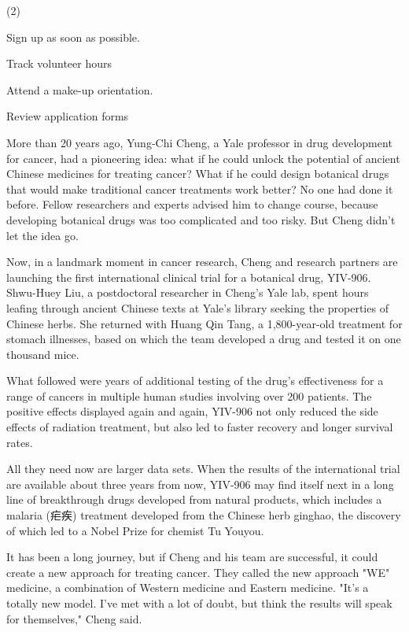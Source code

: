 \documentclass{英语试卷}
\begin{document}
\begin{choices}(2)
  \item Sign up as soon as possible.
  \item Track volunteer hours
  \item Attend a make-up orientation.
  \item Review application forms
\end{choices}
\par More than 20 years ago, Yung-Chi Cheng, a Yale professor in drug development for cancer, had a pioneering idea: what if he could unlock the potential of ancient Chinese medicines for treating cancer? What if he could design botanical drugs that would make traditional cancer treatments work better? No one had done it before. Fellow researchers and experts advised him to change course, because developing botanical drugs was too complicated and too risky. But Cheng didn't let the idea go.\par
\par Now, in a landmark moment in cancer research, Cheng and research partners are launching the first international clinical trial for a botanical drug, YIV-906. Shwu-Huey Liu, a postdoctoral researcher in Cheng's Yale lab, spent hours leafing through ancient Chinese texts at Yale's library seeking the properties of Chinese herbs. She returned with Huang Qin Tang, a 1,800-year-old treatment for stomach illnesses, based on which the team developed a drug and tested it on one thousand mice.\par
\par What followed were years of additional testing of the drug's effectiveness for a range of cancers in multiple human studies involving over 200 patients. The positive effects displayed again and again, YIV-906 not only reduced the side effects of radiation treatment, but also led to faster recovery and longer survival rates.\par
\par All they need now are larger data sets. When the results of the international trial are available about three years from now, YIV-906 may find itself next in a long line of breakthrough drugs developed from natural products, which includes a malaria (疟疾) treatment developed from the Chinese herb ginghao, the discovery of which led to a Nobel Prize for chemist Tu Youyou.\par
\par It has been a long journey, but if Cheng and his team are successful, it could create a new approach for treating cancer. They called the new approach "WE" medicine, a combination of Western medicine and Eastern medicine. "It's a totally new model. I've met with a lot of doubt, but think the results will speak for themselves," Cheng said.\par
\end{document}
